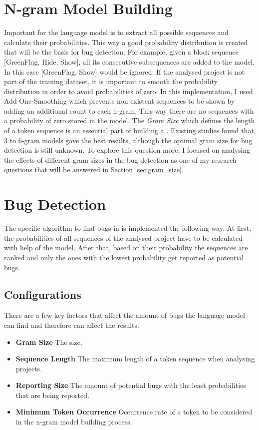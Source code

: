 \section{N-gram Model Building}\label{sec:model}
Important for the language model is to extract all possible sequences and calculate their probabilities. This way a good probability distribution is created that will be the basis for bug detection. For example, given a block sequence [GreenFlag, Hide, Show], all its consecutive subsequences are added to the model. In this case [GreenFlag, Show] would be ignored. If the analysed project is not part of the training dataset, it is important to smooth the probability distribution in order to avoid probabilities of zero. In this implementation, I used Add-One-Smoothing which prevents non existent sequences to be shown by adding an additional count to each n-gram. This way there are no sequences with a probability of zero stored in the model. The \emph{Gram Size} which defines the length of a token sequence is an essential part of building a \ngram{}. Existing studies found that 3 to 6-gram models gave the best results, although the optimal gram size for bug detection is still unknown. To explore this question more, I focused on analysing the effects of different gram sizes in the \scratch{} bug detection as one of my research questions that will be answered in Section \ref{sec:gram_size}.

\section{Bug Detection}\label{sec:detection}
The specific algorithm to find bugs in \scratch{} is implemented the following way. At first, the probabilities of all sequences of the analysed project have to be calculated with help of the model. After that, based on their probability the sequences are ranked and only the ones with the lowest probability get reported as potential bugs. 

\subsection{Configurations}\label{subsec:configurations}
There are a few key factors that affect the amount of bugs the language model can find and therefore can affect the results.
\begin{itemize}
\item \textbf{Gram Size} The \ngram{} size.
\item \textbf{Sequence Length} The maximum length of a token sequence when analysing \scratch{} projects. 
\item \textbf{Reporting Size} The amount of potential bugs with the least probabilities that are being reported.
\item \textbf{Minimum Token Occurrence} Occurrence rate of a token to be considered in the n-gram model building process.
\end{itemize} 
